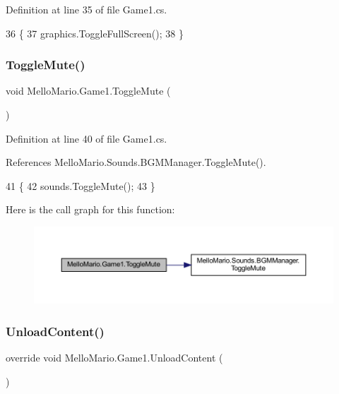 Definition at line 35 of file Game1.\+cs.


\begin{DoxyCode}
36         \{
37             graphics.ToggleFullScreen();
38         \}
\end{DoxyCode}
\mbox{\label{classMelloMario_1_1Game1_ae8aaf9bb75e9a6a914ff98b08350fb02}} 
\subsubsection{Toggle\+Mute()}
{\footnotesize\ttfamily void Mello\+Mario.\+Game1.\+Toggle\+Mute (\begin{DoxyParamCaption}{ }\end{DoxyParamCaption})}



Definition at line 40 of file Game1.\+cs.



References Mello\+Mario.\+Sounds.\+B\+G\+M\+Manager.\+Toggle\+Mute().


\begin{DoxyCode}
41         \{
42             sounds.ToggleMute();
43         \}
\end{DoxyCode}
Here is the call graph for this function\+:
\nopagebreak
\begin{figure}[H]
\begin{center}
\leavevmode
\includegraphics[width=350pt]{classMelloMario_1_1Game1_ae8aaf9bb75e9a6a914ff98b08350fb02_cgraph}
\end{center}
\end{figure}
\mbox{\label{classMelloMario_1_1Game1_a37a64232e27cb6b87d3d050bd910f1bb}} 
\subsubsection{Unload\+Content()}
{\footnotesize\ttfamily override void Mello\+Mario.\+Game1.\+Unload\+Content (\begin{DoxyParamCaption}{ }\end{DoxyParamCaption})\hspace{0.3cm}{\ttfamily [protected]}}




